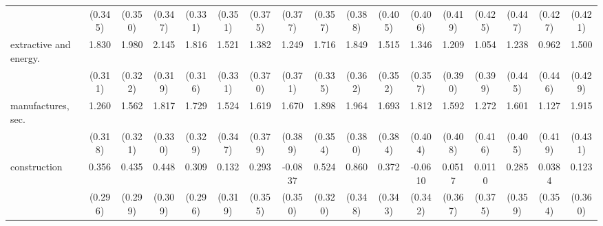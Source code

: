 {\begin{tabular}{l*{16}{c}}
                    &     (0.345)         &     (0.350)         &     (0.347)         &     (0.331)         &     (0.351)         &     (0.375)         &     (0.377)         &     (0.357)         &     (0.388)         &     (0.405)         &     (0.406)         &     (0.419)         &     (0.425)         &     (0.447)         &     (0.427)         &     (0.421)         \\
[1em]
extractive and energy.&       1.830\sym{***}&       1.980\sym{***}&       2.145\sym{***}&       1.816\sym{***}&       1.521\sym{***}&       1.382\sym{***}&       1.249\sym{***}&       1.716\sym{***}&       1.849\sym{***}&       1.515\sym{***}&       1.346\sym{***}&       1.209\sym{**} &       1.054\sym{**} &       1.238\sym{**} &       0.962\sym{*}  &       1.500\sym{***}\\
                    &     (0.311)         &     (0.322)         &     (0.319)         &     (0.316)         &     (0.331)         &     (0.370)         &     (0.371)         &     (0.335)         &     (0.362)         &     (0.352)         &     (0.357)         &     (0.390)         &     (0.399)         &     (0.445)         &     (0.446)         &     (0.429)         \\
[1em]
manufactures, sec.  &       1.260\sym{***}&       1.562\sym{***}&       1.817\sym{***}&       1.729\sym{***}&       1.524\sym{***}&       1.619\sym{***}&       1.670\sym{***}&       1.898\sym{***}&       1.964\sym{***}&       1.693\sym{***}&       1.812\sym{***}&       1.592\sym{***}&       1.272\sym{**} &       1.601\sym{***}&       1.127\sym{**} &       1.915\sym{***}\\
                    &     (0.318)         &     (0.321)         &     (0.330)         &     (0.329)         &     (0.347)         &     (0.379)         &     (0.389)         &     (0.354)         &     (0.380)         &     (0.384)         &     (0.404)         &     (0.408)         &     (0.416)         &     (0.405)         &     (0.419)         &     (0.431)         \\
[1em]
construction        &       0.356         &       0.435         &       0.448         &       0.309         &       0.132         &       0.293         &     -0.0837         &       0.524         &       0.860\sym{*}  &       0.372         &     -0.0610         &      0.0517         &      0.0110         &       0.285         &      0.0384         &       0.123         \\
                    &     (0.296)         &     (0.299)         &     (0.309)         &     (0.296)         &     (0.319)         &     (0.355)         &     (0.350)         &     (0.320)         &     (0.348)         &     (0.343)         &     (0.342)         &     (0.367)         &     (0.375)         &     (0.359)         &     (0.354)         &     (0.360)         \\

\end{tabular}}
